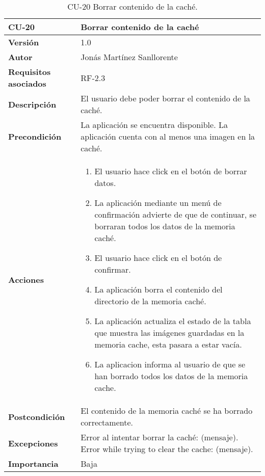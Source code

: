 \begin{table}[p]
	\centering
	\begin{tabularx}{\linewidth}{ p{} p{} }
		\toprule
		\textbf{CU-20}    & \textbf{Borrar contenido de la caché}\\
		\toprule
		\textbf{Versión}              & 1.0    \\
		\textbf{Autor}                & Jonás Martínez Sanllorente \\
		\textbf{Requisitos asociados} & RF-2.3 \\
		\textbf{Descripción}          & El usuario debe poder borrar el contenido de la caché. \\
		\textbf{Precondición}         & La aplicación se encuentra disponible.\newline
                                        La aplicación cuenta con al menos una imagen en la caché. \\
		\textbf{Acciones}             &
		\begin{enumerate}
			\def\labelenumi{\arabic{enumi}.}
			\tightlist
			\item El usuario hace click en el botón de borrar datos.
			\item La aplicación mediante un menú de confirmación advierte de que de continuar, se borraran todos los datos de la memoria caché.
            \item El usuario hace click en el botón de confirmar.
            \item La aplicación borra el contenido del directorio de la memoria caché.
            \item La aplicación actualiza el estado de la tabla que muestra las imágenes guardadas en la memoria cache, esta pasara a estar vacía.
            \item La aplicacion informa al usuario de que se han borrado todos los datos de la memoria cache.
		\end{enumerate}\\
		\textbf{Postcondición}        & El contenido de la memoria caché se ha borrado correctamente. \\
		\textbf{Excepciones}          & Error al intentar borrar la caché: (mensaje).\newline
                                        Error while trying to clear the cache: (mensaje).\\
		\textbf{Importancia}          & Baja \\
		\bottomrule
	\end{tabularx}
	\caption{CU-20 Borrar contenido de la caché.}
\end{table}

